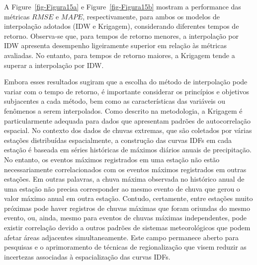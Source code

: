 \documentclass[
]{agujournal2019}
\begin{document}
A Figure~\ref{fig-Figura15a} e Figure~\ref{fig-Figura15b} mostram a
performance das métricas \(RMSE\) e \(MAPE\), respectivamente, para
ambos os modelos de interpolação adotados (IDW e Krigagem), considerando
diferentes tempos de retorno. Observa-se que, para tempos de retorno
menores, a interpolação por IDW apresenta desempenho ligeiramente
superior em relação às métricas avaliadas. No entanto, para tempos de
retorno maiores, a Krigagem tende a superar a interpolação por IDW.

Embora esses resultados sugiram que a escolha do método de interpolação
pode variar com o tempo de retorno, é importante considerar os
princípios e objetivos subjacentes a cada método, bem como as
características das variáveis ou fenômenos a serem interpolados. Como
descrito na metodologia, a Krigagem é particularmente adequada para
dados que apresentam padrões de autocorrelação espacial. No contexto dos
dados de chuvas extremas, que são coletados por várias estações
distribuídas espacialmente, a construção das curvas IDFs em cada estação
é baseada em séries históricas de máximos diários anuais de
precipitação. No entanto, os eventos máximos registrados em uma estação
não estão necessariamente correlacionados com os eventos máximos
registrados em outras estações. Em outras palavras, a chuva máxima
observada no histórico anual de uma estação não precisa corresponder ao
mesmo evento de chuva que gerou o valor máximo anual em outra estação.
Contudo, certamente, entre estações muito próximas pode haver registros
de chuvas máximas que foram oriundas do mesmo evento, ou, ainda, mesmo
para eventos de chuvas máximas independentes, pode existir correlação
devido a outros padrões de sistemas meteorológicos que podem afetar
áreas adjacentes simultaneamente. Este campo permanece aberto para
pesquisas e o aprimoramento de técnicas de regionalização que visem
reduzir as incertezas associadas à espacialização das curvas IDFs.
\end{document}
